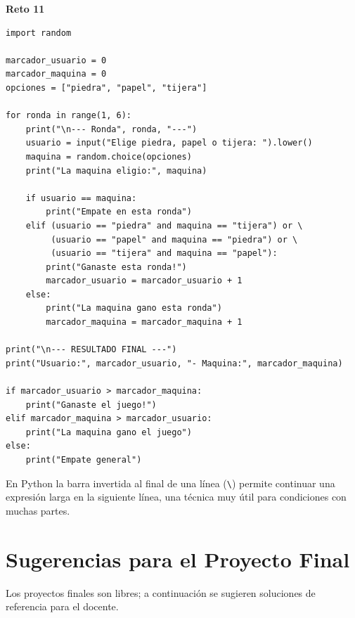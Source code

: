 \documentclass[12pt,a4paper]{article}
\begin{document}
\begin{cajaSolucion}
\textbf{Reto 11}
\begin{lstlisting}[style=pythonStyle]
import random

marcador_usuario = 0
marcador_maquina = 0
opciones = ["piedra", "papel", "tijera"]

for ronda in range(1, 6):
    print("\n--- Ronda", ronda, "---")
    usuario = input("Elige piedra, papel o tijera: ").lower()
    maquina = random.choice(opciones)
    print("La maquina eligio:", maquina)

    if usuario == maquina:
        print("Empate en esta ronda")
    elif (usuario == "piedra" and maquina == "tijera") or \
         (usuario == "papel" and maquina == "piedra") or \
         (usuario == "tijera" and maquina == "papel"):
        print("Ganaste esta ronda!")
        marcador_usuario = marcador_usuario + 1
    else:
        print("La maquina gano esta ronda")
        marcador_maquina = marcador_maquina + 1

print("\n--- RESULTADO FINAL ---")
print("Usuario:", marcador_usuario, "- Maquina:", marcador_maquina)

if marcador_usuario > marcador_maquina:
    print("Ganaste el juego!")
elif marcador_maquina > marcador_usuario:
    print("La maquina gano el juego")
else:
    print("Empate general")
\end{lstlisting}

\begin{cajaNota}
En Python la barra invertida al final de una línea (\texttt{\textbackslash}) permite continuar una expresión larga en la siguiente línea, una técnica muy útil para condiciones con muchas partes.
\end{cajaNota}
\end{cajaSolucion}

\section{Sugerencias para el Proyecto Final}

Los proyectos finales son libres; a continuación se sugieren soluciones de referencia para el docente.
\end{document}
